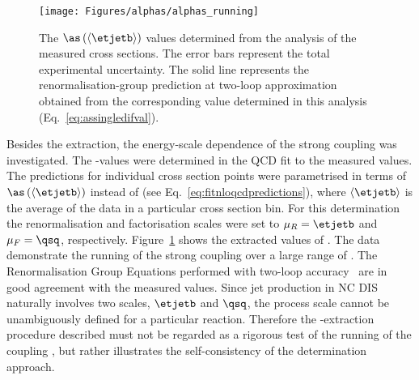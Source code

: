 \begin{figure}[t!]
 \centering
 \texttt{[image: Figures/alphas/alphas\_running]}
 \caption{The $\as\left(\left<\etjetb\right>\right)$ values determined from the analysis of the measured \dsdetjetb cross sections. The error bars represent the total experimental uncertainty. The solid line represents the renormalisation-group prediction at two-loop approximation obtained from the corresponding \asz value determined in this analysis (Eq.~\eqref{eq:assingledifval}).}
 \label{fig:asrunning}
\end{figure}
Besides the \asz extraction, the energy-scale dependence of the strong coupling was investigated. The \as-values were determined in the QCD fit to the measured \dsdetjetb values. The predictions for individual \dsdetjetb cross section points were parametrised in terms of $\as\left(\left<\etjetb\right>\right)$ instead of \asz (see Eq.~\eqref{eq:fitnloqcdpredictions}), where $\left<\etjetb\right>$ is the average \etjetb of the data in a particular cross section bin. For this determination the renormalisation and factorisation scales were set to $\mu_R=\etjetb$ and $\mu_F=\qsq$, respectively. Figure~\ref{fig:asrunning} shows the extracted values of \as. The data demonstrate the running of the strong coupling over a large range of \etjetb. The Renormalisation Group Equations performed with two-loop accuracy~\cite{Gross:1973id, Politzer:1973fx, Gross:1973ju, Politzer:1974fr} are in good agreement with the measured values. Since jet production in NC DIS naturally involves two scales, $\etjetb$ and $\qsq$, the process scale cannot be unambiguously defined for a particular reaction. Therefore the \as-extraction procedure described must not be regarded as a rigorous test of the running of the coupling , but rather illustrates the self-consistency of the \as determination approach.


